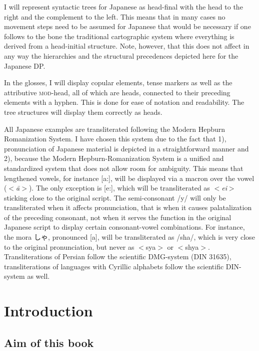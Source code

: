 \documentclass [output=book,colorlinks,citecolor=brown]{langscibook}
\begin{document}
I will represent syntactic trees for Japanese as head-final with the head to the right and the complement to the left. This means that in many cases no movement steps need to be assumed for Japanese that would be necessary if one follows to the bone the traditional cartographic system where everything is derived from a head-initial structure. Note, however, that this does not affect in any way the hierarchies and the structural precedences depicted here for the Japanese DP.

In the glosses, I will display copular elements, tense markers as well as the attributive \textsc{mod}-head, all of which are heads, connected to their preceding elements with a hyphen. This is done for ease of notation and readability. The tree structures will display them correctly as heads.

All Japanese examples are transliterated following the Modern Hepburn Romanization System. I have chosen this system due to the fact that 1), pronunciation of Japanese material is depicted in a straightforward manner and 2), because the Modern Hepburn-Romanization System is a unified and standardized system that does not allow room for ambiguity. This means that lengthened vowels, for instance [a:], will be displayed via a macron over the vowel ($<$\textit{ā}$>$). The only exception is [e:], which will be transliterated as $<$\textit{ei}$>$ sticking close to the original script. The semi-consonant /y/ will only be transliterated when it affects pronunciation, that is when it causes palatalization of the preceding consonant, not when it serves the function in the original Japanese script to display certain consonant-vowel combinations. For instance, the mora しゃ, pronounced [\textctc a], will be transliterated as /sha/, which is very close to the original pronunciation, but never as $<$sya$>$ or $<$shya$>$. Transliterations of Persian follow the scientific DMG-system (DIN 31635), transliterations of languages with Cyrillic alphabets follow the scientific DIN-system as well.






\chapter{Introduction} \label{chapter introduction}

\section{Aim of this book}
\end{document}

